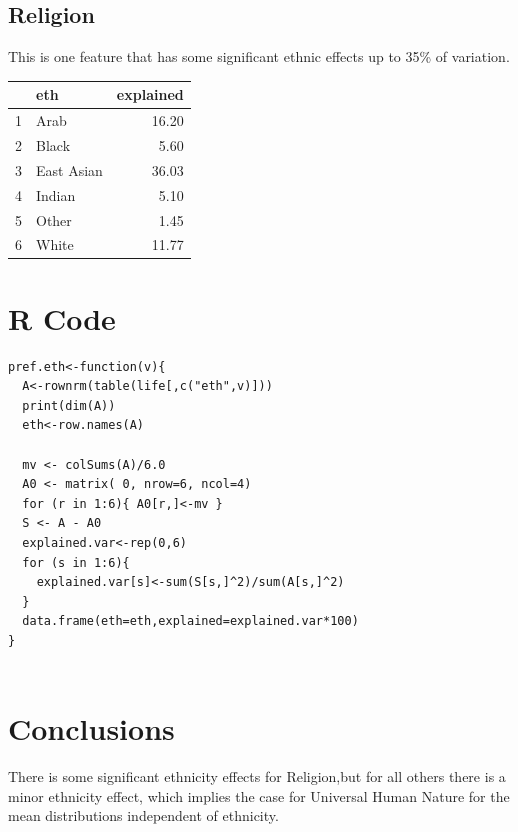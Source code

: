\documentclass{amsart}
\begin{document}
\subsection{Religion}

This is one feature that has some significant ethnic effects up to 35\% of variation.

\begin{table}[ht]
\centering
\begin{tabular}{rlr}
  \hline
 & eth & explained \\ 
  \hline
1 & Arab & 16.20 \\ 
  2 & Black & 5.60 \\ 
  3 & East Asian & 36.03 \\ 
  4 & Indian & 5.10 \\ 
  5 & Other & 1.45 \\ 
  6 & White & 11.77 \\ 
   \hline
\end{tabular}
\end{table}


\section{R Code}

\begin{verbatim}
pref.eth<-function(v){
  A<-rownrm(table(life[,c("eth",v)]))
  print(dim(A))
  eth<-row.names(A)
  
  mv <- colSums(A)/6.0
  A0 <- matrix( 0, nrow=6, ncol=4)
  for (r in 1:6){ A0[r,]<-mv }
  S <- A - A0
  explained.var<-rep(0,6)
  for (s in 1:6){
    explained.var[s]<-sum(S[s,]^2)/sum(A[s,]^2)
  }
  data.frame(eth=eth,explained=explained.var*100)
}


\end{verbatim}

\section{Conclusions}

There is some significant ethnicity effects for Religion,but for all others there is a minor ethnicity effect, which implies the case for Universal Human Nature for the mean distributions independent of ethnicity.
\end{document}
